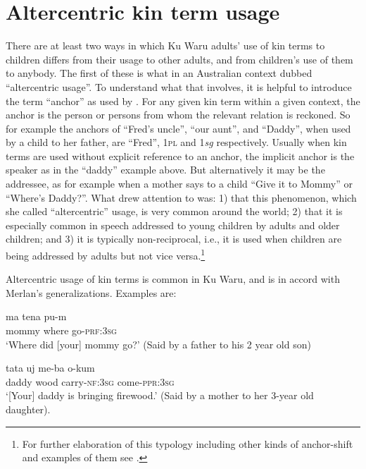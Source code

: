 \documentclass[output=paper]{langsci/langscibook}
\begin{document}
\section{Altercentric kin term usage}\label{s:ar3}

There are at least two ways in which Ku Waru adults’ use of kin terms to children differs from their usage to other adults, and from children’s use of them to anybody. The first of these is what \cite{Merlan1982} in an Australian context dubbed “altercentric usage”. To understand what that involves, it is helpful to introduce the term “anchor” as used by \cite{DahlK-T2001}. For any given kin term within a given context, the anchor is the person or persons from whom the relevant relation is reckoned. So for example the anchors of “Fred’s uncle”, “our aunt”,  and “Daddy”, when used by a child to her father, are “Fred”, 1\textsc{pl} and 1\textit{sg}  respectively. Usually when kin terms are used without explicit reference to an anchor, the implicit anchor is the speaker as in the “daddy” example above. But alternatively it may be the addressee, as for example when a mother says to a child “Give it to Mommy” or “Where’s Daddy?”. What \cite{Merlan1982} drew attention to was: 1) that this phenomenon, which she called “altercentric” usage, is very common around the world; 2) that it is especially common in speech addressed to young children by adults and older children; and 3) it is typically non-reciprocal, i.e., it is used when children are being addressed by adults but not vice versa.\footnote{For further elaboration of this typology including other kinds of anchor-shift and examples of them see \cite{Agha2006}.} 

Altercentric usage of kin terms is common in Ku Waru, and is in accord with Merlan’s generalizations. Examples are:

\begin{exe}
	\ex \label{ex:rumsey:ar17}
	\gll ma tena pu-m\\
	mommy where	go-\textsc{prf}:3\textsc{sg}\\
	\trans ‘Where did [your] mommy go?’  (Said by a father to his 2\textonehalf{} year old son)
\end{exe}

\begin{exe}
	\ex \label{ex:rumsey:ar18}
	\gll tata uj me-ba o-kum\\
	daddy wood carry-\textsc{nf}:3\textsc{sg} come-\textsc{ppr}:3\textsc{sg}\\
	\trans ‘[Your] daddy is bringing firewood.’ (Said by a mother to her 3-year old daughter).
\end{exe}
\end{document}
